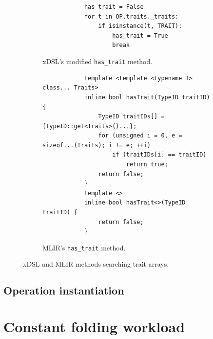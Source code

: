 \begin{figure}[H]
    \centering
    \begin{subfigure}[b]{0.45\textwidth}
       \centering
        \begin{verbatim}
            has_trait = False
            for t in OP.traits._traits:
                if isinstance(t, TRAIT):
                    has_trait = True
                    break
        \end{verbatim}
        \footnotesize\vspace{5.5em}
        \captionsetup{name=Listing}
        \caption{xDSL's modified \texttt{has_trait} method.}
        \label{listing:ubenchmark-trait-checks-both-xdsl}
    \end{subfigure}
    \hfill
    \begin{subfigure}[b]{0.45\textwidth}
        \centering
        \begin{verbatim}
            template <template <typename T> class... Traits>
            inline bool hasTrait(TypeID traitID) {
                TypeID traitIDs[] = {TypeID::get<Traits>()...};
                for (unsigned i = 0, e = sizeof...(Traits); i != e; ++i)
                    if (traitIDs[i] == traitID)
                        return true;
                return false;
            }
            template <>
            inline bool hasTrait<>(TypeID traitID) {
                return false;
            }
        \end{verbatim}
        \captionsetup{name=Listing}
        \caption{MLIR's \texttt{has_trait} method.}
        \label{listing:ubenchmark-trait-checks-both-mlir}
    \end{subfigure}
    \vspace{1em}
    \captionsetup{name=Listing}
    \caption{xDSL and MLIR methods searching trait arrays.}
    \label{listing:ubenchmark-trait-checks-both}
\end{figure}


\subsection{Operation instantiation}



\section{Constant folding workload}












